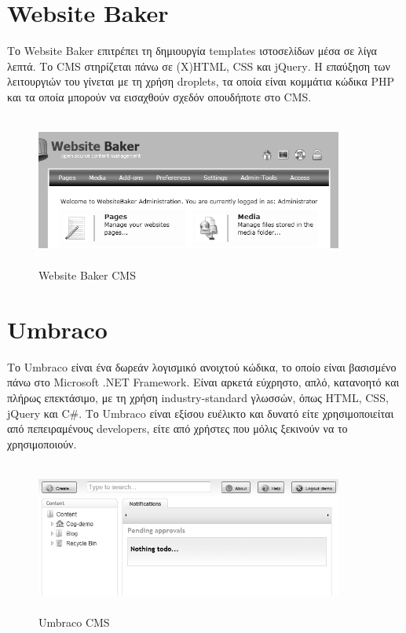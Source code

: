 \documentclass[12pt]{report}
\begin{document}
\section{\textlatin{Website Baker}}
Το \textlatin{Website Baker} επιτρέπει τη δημιουργία \textlatin{templates} ιστοσελίδων μέσα σε λίγα λεπτά. Το \textlatin{CMS} στηρίζεται πάνω σε \textlatin{(X)HTML, CSS} και \textlatin{jQuery}. Η επαύξηση των λειτουργιών του γίνεται με τη χρήση \textlatin{droplets}, τα οποία είναι κομμάτια κώδικα \textlatin{PHP} και τα οποία μπορούν να εισαχθούν σχεδόν οπουδήποτε στο \textlatin{CMS}.
\begin{figure}[H]
\centering
\includegraphics[width=0.9\textwidth, height=5cm]{websitebaker-gray}
\caption{\textlatin{Website Baker CMS}}
\label{fig:site_baker}
\end{figure}

\section{\textlatin{Umbraco}}
Το \textlatin{Umbraco} είναι ένα δωρεάν λογισμικό ανοιχτού κώδικα, το οποίο είναι βασισμένο πάνω στο \textlatin{Microsoft .NET Framework}. Είναι αρκετά εύχρηστο, απλό, κατανοητό και πλήρως επεκτάσιμο, με τη χρήση \textlatin{industry-standard} γλωσσών, όπως \textlatin{HTML, CSS, jQuery} και \textlatin{C\#}. Το \textlatin{Umbraco} είναι εξίσου ευέλικτο και δυνατό είτε χρησιμοποιείται από πεπειραμένους \textlatin{developers}, είτε από χρήστες που μόλις ξεκινούν να το χρησιμοποιούν.
\begin{figure}[H]
\centering
\includegraphics[width=0.9\textwidth, height=5cm]{umbraco-gray}
\caption{\textlatin{Umbraco CMS}}
\label{fig:umbraco}
\end{figure}
\end{document}
